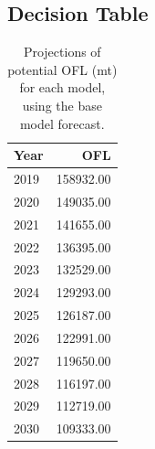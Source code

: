 \documentclass[12pt,]{article}
\begin{document}
\FloatBarrier

\hypertarget{decision-table}{%
\subsection*{Decision Table}\label{decision-table}}

\begin{table}[ht]
\centering
\caption{Projections of potential OFL (mt) for 
                                        each model, using the base model forecast.} 
\label{tab:OFL_projection}
\begin{tabular}{lr}
  \hline
Year & OFL \\ 
  \hline
2019 & 158932.00 \\ 
  2020 & 149035.00 \\ 
  2021 & 141655.00 \\ 
  2022 & 136395.00 \\ 
  2023 & 132529.00 \\ 
  2024 & 129293.00 \\ 
  2025 & 126187.00 \\ 
  2026 & 122991.00 \\ 
  2027 & 119650.00 \\ 
  2028 & 116197.00 \\ 
  2029 & 112719.00 \\ 
  2030 & 109333.00 \\ 
   \hline
\end{tabular}
\end{table}
\end{document}
